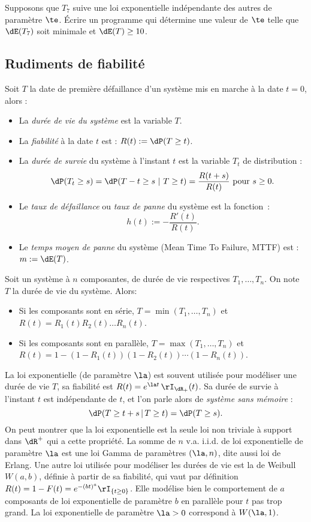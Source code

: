 \begin{exo}
  Supposons que $T_7$ suive une loi exponentielle indépendante des autres de
  paramètre $\te$. Écrire un programme \ML{} qui détermine une valeur de $\te$
  telle que $\dE(T_7)$ soit minimale et $\dE(T) \geq 10$.
\end{exo}

%
\subsection{Rudiments de fiabilité}
%

Soit $T$ la date de première défaillance d'un système mis en marche à
la date $t=0$, alors :
\begin{itemize}
\item La \emph{durée de vie du système} est la variable $T$.
\item La \emph{fiabilité} à la date $t$ est : $R(t):=\dP(T \geq t)$.
\item La \emph{durée de survie} du système à l'instant $t$ est la
  variable $T_t$ de distribution :
  $$
  \dP(T_t \geq s) =\dP(T-t\geq s\ |\ T\geq t) =\frac{R(t+s)}{R(t)}
  \text{ pour } s \geq 0.
  $$
\item Le \emph{taux de défaillance} ou \emph{taux de panne} du système
  est la fonction~: $$h(t):=-\frac{R'(t)}{R(t)}.$$
\item Le \emph{temps moyen de panne} du système (Mean Time To Failure,
  MTTF) est : $m:=\dE(T)$.
\end{itemize}

Soit un système à $n$ composantes, de durée de vie respectives
$T_1,\ldots,T_n$. On note $T$ la durée de vie du système. Alors:
\begin{itemize}
\item Si les composants sont en série, $T=\min(T_1,\ldots,T_n)$ et
  $R(t)=R_1(t)R_2(t)\ldots R_n(t)$.
\item Si les composants sont en parallèle, $T=\max(T_1,\ldots,T_n)$ et
  $R(t)=1-(1-R_1(t))(1-R_2(t))\cdots(1-R_n(t))$.
\end{itemize}

La loi exponentielle (de paramètre $\la$) est souvent utilisée pour
modéliser une durée de vie $T$, sa fiabilité est $R(t)=e^{\la
  t}\,\rI_{\dR_+}(t)$. Sa durée de survie à l'instant $t$ est
indépendante de $t$, et l'on parle alors de \emph{système sans
  mémoire} :
$$
\dP(T \geq t+s\,|\,T\geq t)=\dP(T \geq s).
$$
On peut montrer que la loi exponentielle est la seule loi non
triviale à support dans $\dR^+$ qui a cette propriété.  La somme de
$n$ v.a. i.i.d. de loi exponentielle de paramètre $\la$ est une loi
Gamma de paramètres $(\la,n)$, dite aussi loi de Erlang. Une autre loi
utilisée pour modéliser les durées de vie est la de Weibull $W(a,b)$,
définie à partir de sa fiabilité, qui vaut par définition
$R(t)=1-F(t)=e^{-(bt)^a}\rI_{\{t \geq 0\}}$. Elle modélise bien le
comportement de $a$ composants de loi exponentielle de paramètre $b$
en parallèle pour $t$ pas trop grand.  La loi exponentielle de
paramètre $\la>0$ correspond à $W(\la,1)$.

